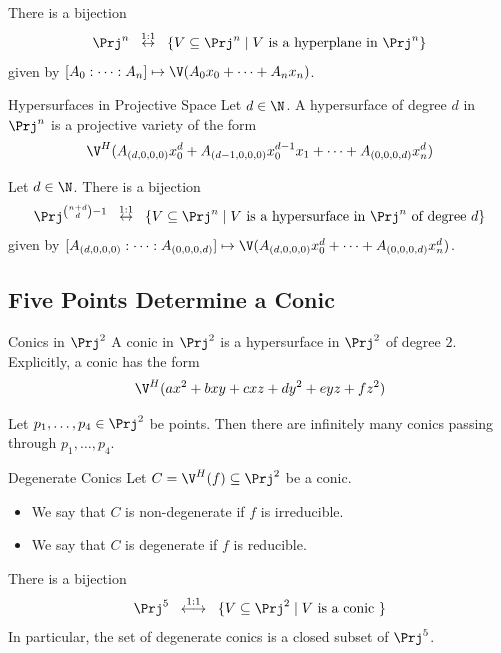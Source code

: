\documentclass[a4paper]{article}
\begin{document}
\begin{prp}{}{} There is a bijection $$\Prj^n\;\;\overset{1:1}{\leftrightarrow}\;\;\{V\subseteq\Prj^n\;|\;V\text{ is a hyperplane in }\Prj^n\}$$ given by $[A_0:\cdots:A_n]\mapsto\V(A_0x_0+\cdots+A_nx_n)$. 
\end{prp}

\begin{defn}{Hypersurfaces in Projective Space}{} Let $d\in\N$. A hypersurface of degree $d$ in $\Prj^n$ is a projective variety of the form $$\V^H(A_{(d,0,0,0)}x_0^d+A_{(d-1,0,0,0)}x_0^{d-1}x_1+\cdots+A_{(0,0,0,d)}x_n^d)$$
\end{defn}

\begin{prp}{}{} Let $d\in\N$. There is a bijection $$\Prj^{\binom{n+d}{d}-1}\;\;\overset{1:1}{\leftrightarrow}\;\;\{V\subseteq\Prj^n\;|\;V\text{ is a hypersurface in }\Prj^n\text{ of degree }d\}$$ given by $[A_{(d,0,0,0)}:\cdots:A_{(0,0,0,d)}]\mapsto\V(A_{(d,0,0,0)}x_0^d+\cdots+A_{(0,0,0,d)}x_n^d)$. 
\end{prp}

\subsection{Five Points Determine a Conic}
\begin{defn}{Conics in $\Prj^2$}{} A conic in $\Prj^2$ is a hypersurface in $\Prj^2$ of degree $2$. Explicitly, a conic has the form $$\V^H(ax^2+bxy+cxz+dy^2+eyz+fz^2)$$
\end{defn}

\begin{prp}{}{} Let $p_1,\dots,p_4\in\Prj^2$ be points. Then there are infinitely many conics passing through $p_1,\dots,p_4$. 
\end{prp}

\begin{defn}{Degenerate Conics}{} Let $C=\V^H(f)\subseteq\Prj^2$ be a conic. 
\begin{itemize}
\item We say that $C$ is non-degenerate if $f$ is irreducible. 
\item We say that $C$ is degenerate if $f$ is reducible. 
\end{itemize}
\end{defn}

\begin{lmm}{}{} There is a bijection $$\Prj^5\;\;\overset{1:1}{\longleftrightarrow}\;\;\{V\subseteq\Prj^2\;|\;V\text{ is a conic }\}$$ In particular, the set of degenerate conics is a closed subset of $\Prj^5$. 
\end{lmm}
\end{document}
